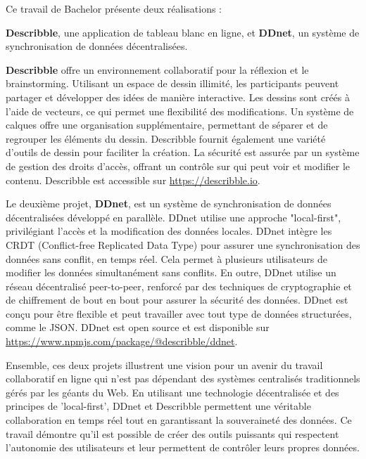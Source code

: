 Ce travail de Bachelor présente deux réalisations : 

\textbf{Describble}, une application de tableau blanc en ligne, et \textbf{DDnet}, un système de synchronisation de données décentralisées.

\textbf{Describble} offre un environnement collaboratif pour la réflexion et le brainstorming. Utilisant un espace de dessin illimité, les participants peuvent partager et développer des idées de manière interactive. Les dessins sont créés à l'aide de vecteurs, ce qui permet une flexibilité des modifications. Un système de calques offre une organisation supplémentaire, permettant de séparer et de regrouper les éléments du dessin. Describble fournit également une variété d'outils de dessin pour faciliter la création. La sécurité est assurée par un système de gestion des droits d'accès, offrant un contrôle sur qui peut voir et modifier le contenu. Describble est accessible sur \url{https://describble.io}.

\asterism

Le deuxième projet, \textbf{DDnet}, est un système de synchronisation de données décentralisées développé en parallèle. DDnet utilise une approche "local-first", privilégiant l'accès et la modification des données locales. DDnet intègre les CRDT (Conflict-free Replicated Data Type) pour assurer une synchronisation des données sans conflit, en temps réel. Cela permet à plusieurs utilisateurs de modifier les données simultanément sans conflits. En outre, DDnet utilise un réseau décentralisé peer-to-peer, renforcé par des techniques de cryptographie et de chiffrement de bout en bout pour assurer la sécurité des données. DDnet est conçu pour être flexible et peut travailler avec tout type de données structurées, comme le JSON. DDnet est open source et est disponible sur \url{https://www.npmjs.com/package/@describble/ddnet}.

\asterism

Ensemble, ces deux projets illustrent une vision pour un avenir du travail collaboratif en ligne qui n'est pas dépendant des systèmes centralisés traditionnels gérés par les géants du Web. En utilisant une technologie décentralisée et des principes de 'local-first', DDnet et Describble permettent une véritable collaboration en temps réel tout en garantissant la souveraineté des données. Ce travail démontre qu'il est possible de créer des outils puissants qui respectent l'autonomie des utilisateurs et leur permettent de contrôler leurs propres données.